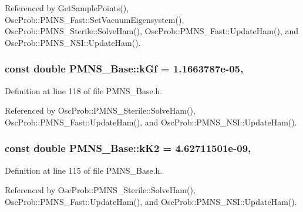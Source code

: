 Referenced by Get\+Sample\+Points(), Osc\+Prob\+::\+P\+M\+N\+S\+\_\+\+Fast\+::\+Set\+Vacuum\+Eigensystem(), Osc\+Prob\+::\+P\+M\+N\+S\+\_\+\+Sterile\+::\+Solve\+Ham(), Osc\+Prob\+::\+P\+M\+N\+S\+\_\+\+Fast\+::\+Update\+Ham(), and Osc\+Prob\+::\+P\+M\+N\+S\+\_\+\+N\+S\+I\+::\+Update\+Ham().

\subsubsection[{\texorpdfstring{k\+Gf}{kGf}}]{\setlength{\rightskip}{0pt plus 5cm}const double P\+M\+N\+S\+\_\+\+Base\+::k\+Gf = 1.\+1663787e-\/05\hspace{0.3cm}{\ttfamily [static]}, {\ttfamily [protected]}}\hypertarget{classOscProb_1_1PMNS__Base_a7f26a3456128234b2ae6cc9141a6532f}{}\label{classOscProb_1_1PMNS__Base_a7f26a3456128234b2ae6cc9141a6532f}


Definition at line 118 of file P\+M\+N\+S\+\_\+\+Base.\+h.



Referenced by Osc\+Prob\+::\+P\+M\+N\+S\+\_\+\+Sterile\+::\+Solve\+Ham(), Osc\+Prob\+::\+P\+M\+N\+S\+\_\+\+Fast\+::\+Update\+Ham(), and Osc\+Prob\+::\+P\+M\+N\+S\+\_\+\+N\+S\+I\+::\+Update\+Ham().

\subsubsection[{\texorpdfstring{k\+K2}{kK2}}]{\setlength{\rightskip}{0pt plus 5cm}const double P\+M\+N\+S\+\_\+\+Base\+::k\+K2 = 4.\+62711501e-\/09\hspace{0.3cm}{\ttfamily [static]}, {\ttfamily [protected]}}\hypertarget{classOscProb_1_1PMNS__Base_a326fc5016d7dd7ce05682c06cdcb6d94}{}\label{classOscProb_1_1PMNS__Base_a326fc5016d7dd7ce05682c06cdcb6d94}


Definition at line 115 of file P\+M\+N\+S\+\_\+\+Base.\+h.



Referenced by Osc\+Prob\+::\+P\+M\+N\+S\+\_\+\+Sterile\+::\+Solve\+Ham(), Osc\+Prob\+::\+P\+M\+N\+S\+\_\+\+Fast\+::\+Update\+Ham(), and Osc\+Prob\+::\+P\+M\+N\+S\+\_\+\+N\+S\+I\+::\+Update\+Ham().

